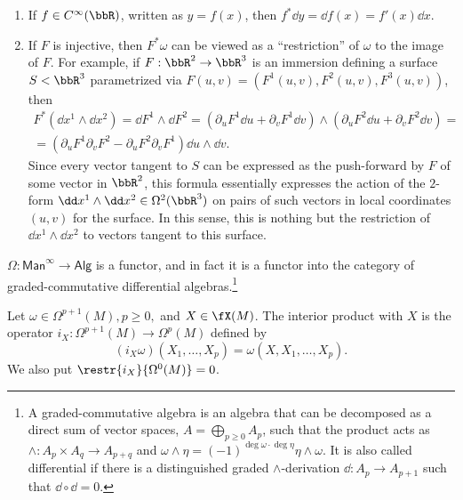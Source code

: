 \begin{example}
    \begin{enumerate}
        \item If $f\in C^\infty(\bbR)$, written as $y=f(x)$, then $f^\ast \dd y=\dd f(x)=f'(x)\dd x$.
        \item If $F$ is injective, then $F^\ast\omega$ can be viewed as a ``restriction'' of $\omega$ to the image of $F$. For example, if $F:\bbR^2\to \bbR^3$ is an immersion defining a surface $S<\bbR^3$ parametrized via $F(u,v)=(F^1(u,v),F^2(u,v),F^3(u,v))$, then 
        \begin{multline}
            F^\ast(\dd x^1\wedge\dd x^2)=\dd F^1\wedge\dd F^2=(\partial_u F^1\dd u+\partial_v F^1\dd v)\wedge(\partial_u F^2\dd u+\partial_v F^2\dd v)=\\=(\partial_u F^1\partial_vF^2-\partial_uF^2\partial_vF^1)\dd u\wedge\dd v.
        \end{multline}
        Since every vector tangent to $S$ can be expressed as the push-forward by $F$ of some vector in $\bbR^2$, this formula essentially expresses the action of the $2$-form $\dd x^1\wedge\dd x^2\in\Omega^2(\bbR^3)$ on pairs of such vectors in local coordinates $(u,v)$ for the surface. In this sense, this is nothing but the restriction of  $\dd x^1\wedge\dd x^2$ to vectors tangent to this surface.
    \end{enumerate}
\end{example}


\begin{cor}
    $\Omega:\mathsf{Man}^\infty \to\mathsf{Alg}$ is a functor, and in fact it is a functor into the category of graded-commutative differential algebras.\footnote{A graded-commutative algebra is an algebra that can be decomposed as a direct sum of vector spaces, $A=\bigoplus_{p\geq 0}A_p $, such that the product acts as $\wedge:A_p\times A_q\to A_{p+q}$ and $\omega\wedge\eta=(-1)^{\deg\omega\cdot\deg\eta}\eta\wedge\omega$. It is also called differential if there is a distinguished graded $\wedge$-derivation $\dd:A_p\to A_{p+1}$ such that $\dd\circ \dd=0$.}
\end{cor}

\begin{defn}
    Let $\omega\in\Omega^{p+1}(M), p\geq 0,$ and $X\in\fX(M)$. The interior product with $X$ is the operator $i_X:\Omega^{p+1}(M)\to \Omega^p(M)$ defined by 
    \[(i_X \omega)(X_1,\ldots,X_p)=\omega(X,X_1,\ldots,X_p).\]
    We also put $\restr{i_X}{\Omega^0(M)}=0$.
\end{defn}


